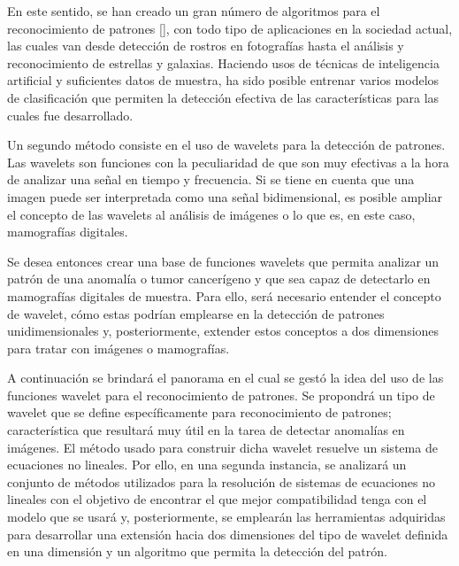 \par En este sentido, se han creado un gran n\'umero de algoritmos para el reconocimiento de patrones [\cite{20}], con todo tipo de aplicaciones en la sociedad actual, las cuales van desde detecci\'on de rostros en fotograf\'ias hasta el an\'alisis y reconocimiento de estrellas y galaxias. Haciendo usos de t\'ecnicas de inteligencia artificial y suficientes datos de muestra, ha sido posible entrenar varios modelos de clasificaci\'on que permiten la detecci\'on efectiva de las caracter\'isticas para las cuales fue desarrollado.

\par Un segundo m\'etodo consiste en el uso de wavelets para la detecci\'on de patrones. Las wavelets son funciones con la peculiaridad de que son muy efectivas a la hora de analizar una se\~nal en tiempo y frecuencia. Si se tiene en cuenta que una imagen puede ser interpretada como una se\~nal bidimensional, es posible ampliar el concepto de las wavelets al an\'alisis de im\'agenes o lo que es, en este caso, mamograf\'ias digitales.

\par Se desea entonces crear una base de funciones wavelets que permita analizar un patr\'on de una anomal\'ia o tumor cancer\'igeno y que sea capaz de detectarlo en mamograf\'ias digitales de muestra. Para ello, ser\'a necesario entender el concepto de wavelet, c\'omo estas podr\'ian emplearse en la detecci\'on de patrones unidimensionales y, posteriormente, extender estos conceptos a dos dimensiones para tratar con im\'agenes o mamograf\'ias.

\par A continuaci\'on se brindar\'a el panorama en el cual se gest\'o la idea del uso de las funciones wavelet para el reconocimiento de patrones. Se propondr\'a un tipo de wavelet que se define espec\'ificamente para reconocimiento de patrones; caracter\'istica que resultar\'a muy \'util en la tarea de detectar anomal\'ias en im\'agenes. El método usado para construir dicha wavelet resuelve un sistema de ecuaciones no lineales. Por ello, en una segunda instancia, se analizar\'a un conjunto de m\'etodos utilizados para la resoluci\'on de sistemas de ecuaciones no lineales con el objetivo de encontrar el que mejor compatibilidad tenga con el modelo que se usar\'a y, posteriormente, se emplear\'an las herramientas adquiridas para desarrollar una extensi\'on hacia dos dimensiones del tipo de wavelet definida en una dimensi\'on y un algoritmo que permita la detecci\'on del patr\'on.

